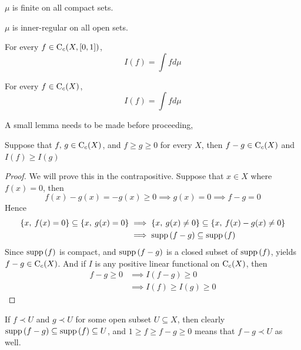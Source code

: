 \documentclass[../../main.tex]{subfiles}
\begin{document}
\begin{enumalpha}
    \label{7.2.h}
%
%
    \item $\mu$ is finite on all compact sets.
    \label{7.2.i}
%
%
    \item $\mu$ is inner-regular on all open sets.
    \label{7.2.j}
%
%
    \item For every $f\in\operatorname{C}_c({X,[0,1]})$, 
    \begin{equation}\label{integral equation}
        I(f) = \int fd\mu
    \end{equation}
    \label{7.2.k}
%
%
    \item For every $f\in\operatorname{C}_c({X})$,
    \begin{equation}\label{integral equation general}
        I(f) = \int fd\mu
    \end{equation}
\end{enumalpha}

A small lemma needs to be made before proceeding,
    \begin{lemma}\label{lemma I is monotonic}
        Suppose that $f,\, g\in\operatorname{C}_c({X})$, and $f\geq g\geq 0$ for every $X$, then $f-g\in\operatorname{C}_c({X})$ and $I(f)\geq I(g)$
    \end{lemma}
    \begin{proof}
        We will prove this in the contrapositive. Suppose that $x\in X$ where $f(x) = 0$, then
        \[
        f(x)-g(x) = -g(x)\geq 0\implies g(x)=0\implies f-g=0
        \]
        Hence
        \begin{align*}
            \left\{x,\:f(x)=0\right\}\subseteq\left\{x,\:g(x)=0\right\}&\implies \left\{x,\:g(x)\neq0\right\}\subseteq \left\{x,\:f(x)-g(x)\neq0\right\}\\
            &\implies \operatorname{supp}{(f-g)}\subseteq \operatorname{supp}{(f)}
        \end{align*}
        Since $\operatorname{supp}{(f)}$ is compact, and $\operatorname{supp}{(f-g)}$ is a closed subset of $\operatorname{supp}{(f)}$, yields $f-g\in\operatorname{C}_c({X})$. And if $I$ is any positive linear functional on $\operatorname{C}_c({X})$, then
        \begin{align*}
            f-g\geq 0&\implies I(f-g)\geq 0\\
            &\implies I(f)\geq I(g)\geq 0
        \end{align*}
    \end{proof}
\remark If $f\prec U$ and $g\prec U$ for some open subset $U\subseteq X$, then clearly $\operatorname{supp}{(f-g)}\subseteq \operatorname{supp}{(f)}\subseteq U$, and $1\geq f\geq f-g\geq 0$ means that $f-g\prec U$ as well.
\end{document}
